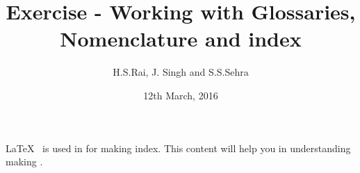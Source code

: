 \documentclass[11pt,a4paper]{article}
\title{Exercise - Working with Glossaries, Nomenclature and index}
\date{12th March, 2016}
\author{H.S.Rai, J. Singh and S.S.Sehra}
\begin{document}
\maketitle

\LaTeX\ \index{\LaTeX} is used in for making index. This content will help you in understanding making .

\printindex
\end{document}
